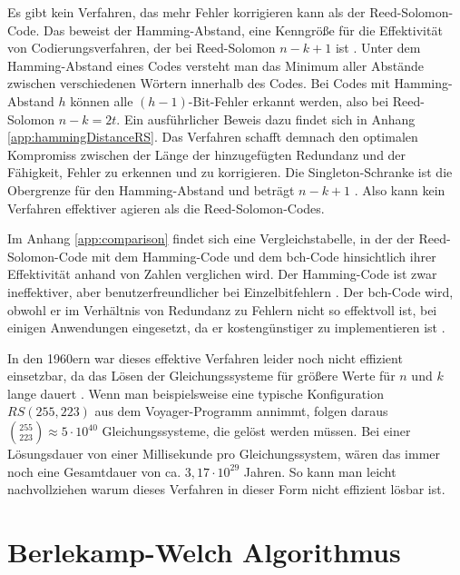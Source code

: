 Es gibt kein Verfahren, das mehr Fehler korrigieren kann als der Reed-Solomon-Code.
Das beweist der Hamming-Abstand, eine Kenngröße für die Effektivität von Codierungsverfahren, der bei Reed-Solomon $n-k+1$ ist \cite{reedPolynomialCodesCertain1960}.
Unter dem Hamming-Abstand eines Codes versteht man das Minimum aller Abstände zwischen verschiedenen Wörtern innerhalb des Codes.
Bei Codes mit Hamming-Abstand $h$ können alle $(h-1)$-Bit-Fehler erkannt werden, also bei Reed-Solomon $n-k=2t$.
Ein ausführlicher Beweis dazu findet sich in Anhang \ref{app:hammingDistanceRS}.
Das Verfahren schafft demnach den optimalen Kompromiss zwischen der Länge der hinzugefügten Redundanz und der Fähigkeit, Fehler zu erkennen und zu korrigieren.
Die Singleton-Schranke ist die Obergrenze für den Hamming-Abstand und beträgt $n-k+1$ \cite{friedrichsKanalcodierung1996}.
Also kann kein Verfahren effektiver agieren als die Reed-Solomon-Codes.

Im Anhang \ref{app:comparison} findet sich eine Vergleichstabelle, in der der Reed-Solomon-Code mit dem Hamming-Code und dem \acrshort{bch}-Code hinsichtlich ihrer Effektivität anhand von Zahlen verglichen wird.
Der Hamming-Code ist zwar ineffektiver, aber benutzerfreundlicher bei Einzelbitfehlern \cite{williamsHammingCodeFehlererkennungUnd2024}.
Der \acrshort{bch}-Code wird, obwohl er im Verhältnis von Redundanz zu Fehlern nicht so effektvoll ist, bei einigen Anwendungen eingesetzt, da er kostengünstiger zu implementieren ist \cite{schulz-hankeBCHCodesCombined2023}. 

In den 1960ern war dieses effektive Verfahren leider noch nicht effizient einsetzbar, da das Lösen der Gleichungssysteme für größere Werte für $n$ und $k$ lange dauert \cite{verbeureReedSolomonErrorCorrecting2022}. 
Wenn man beispielsweise eine typische Konfiguration $RS(255,223)$ aus dem Voyager-Programm annimmt, folgen daraus $\binom{255}{223}\approx5\cdot 10^{40}$ Gleichungssysteme, die gelöst werden müssen.
Bei einer Lösungsdauer von einer Millisekunde pro Gleichungssystem, wären das immer noch eine Gesamtdauer von ca. $3,17\cdot10^{29}$ Jahren. 
So kann man leicht nachvollziehen warum dieses Verfahren in dieser Form nicht effizient lösbar ist.

\section{Berlekamp-Welch Algorithmus}\label{sec:bwAlgo}

